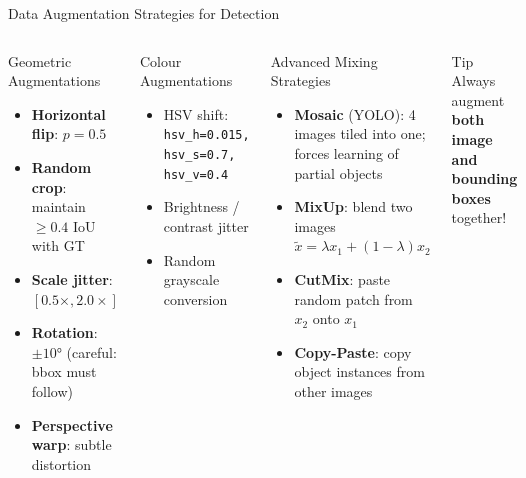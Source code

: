 \documentclass[aspectratio=169]{beamer}
\begin{document}
\begin{frame}{Data Augmentation Strategies for Detection}
  \begin{columns}
    \begin{block}{Geometric Augmentations}
      \begin{itemize}
        \item \textbf{Horizontal flip}: $p=0.5$
        \item \textbf{Random crop}: maintain $\geq 0.4$ IoU with GT
        \item \textbf{Scale jitter}: $[0.5\times, 2.0\times]$
        \item \textbf{Rotation}: $\pm 10°$ (careful: bbox must follow)
        \item \textbf{Perspective warp}: subtle distortion
      \end{itemize}
    \end{block}
    \begin{block}{Colour Augmentations}
      \begin{itemize}
        \item HSV shift: \texttt{hsv\_h=0.015, hsv\_s=0.7, hsv\_v=0.4}
        \item Brightness / contrast jitter
        \item Random grayscale conversion
      \end{itemize}
    \end{block}
    \begin{block}{Advanced Mixing Strategies}
      \begin{itemize}
        \item \textbf{Mosaic} (YOLO): 4 images tiled into one; forces learning of partial objects
        \item \textbf{MixUp}: blend two images $\tilde{x} = \lambda x_1 + (1-\lambda)x_2$
        \item \textbf{CutMix}: paste random patch from $x_2$ onto $x_1$
        \item \textbf{Copy-Paste}: copy object instances from other images
      \end{itemize}
    \end{block}
    \vspace{2pt}
    \begin{alertblock}{Tip}
      Always augment \textbf{both image and bounding boxes} together!
    \end{alertblock}
  \end{columns}
\end{frame}
\end{document}
